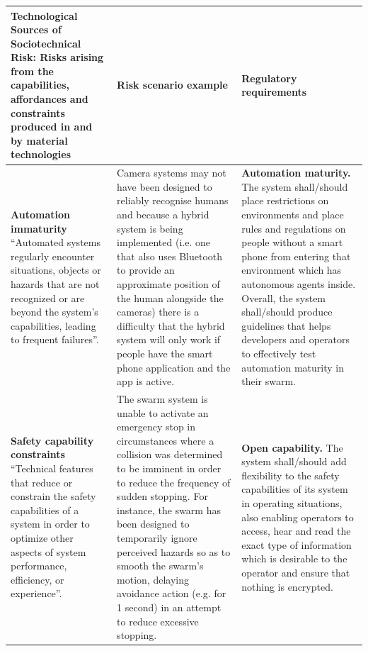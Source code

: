 \documentclass[lettersize,journal]{IEEEtran}
\begin{document}
\begin{landscape}
\begin{table}[]
    \centering
    \begin{tabular}{|p{0.3\textheight}|p{0.35\textheight}|p{0.35\textheight}|}
        \hline
        \textbf{Technological Sources of Sociotechnical Risk:} Risks arising from the capabilities, affordances and constraints produced in and by material technologies & \textbf{Risk scenario example} &	\textbf{Regulatory requirements} \\
        \hline
        \textbf{Automation immaturity} ``Automated systems regularly encounter situations, objects or hazards that are not recognized or are beyond the system’s capabilities, leading to frequent failures”. \cite{macrae2021learning} & Camera systems may not have been designed to reliably recognise humans and because a hybrid system is being implemented (i.e. one that also uses Bluetooth to provide an approximate position of the human alongside the cameras) there is a difficulty that the hybrid system will only work if people have the smart phone application and the app is active. & \textbf{Automation maturity.} The system shall/should place restrictions on environments and place rules and regulations on people without a smart phone from entering that environment which has autonomous agents inside. Overall, the system shall/should produce guidelines that helps developers and operators to effectively test automation maturity in their swarm.\\
        \hline
        \textbf{Safety capability constraints} ``Technical features that reduce or constrain the safety capabilities of a system in order to optimize other aspects of system performance, efficiency, or experience”. \cite{macrae2021learning} & The swarm system is unable to activate an emergency stop in circumstances where a collision was determined to be imminent in order to reduce the frequency of sudden stopping. For instance, the swarm has been designed to temporarily ignore perceived hazards so as to smooth the swarm’s motion, delaying avoidance action (e.g. for 1 second) in an attempt to reduce excessive stopping. & \textbf{Open capability.} The system shall/should add flexibility to the safety capabilities of its system in operating situations, also enabling operators to access, hear and read the exact type of information which is desirable to the operator and ensure that nothing is encrypted.\\
        \hline

\end{tabular}
\end{table}
\end{landscape}
\end{document}
